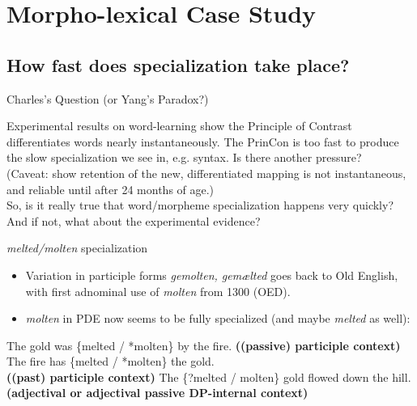 \documentclass[hyperref={pdfpagelabels=false}]{beamer}
\begin{document}
\section{Morpho-lexical Case Study}
\subsection{How fast does specialization take place?}

\begin{frame}{Charles's Question (or Yang's Paradox?)}
		\begin{center}
			Experimental results on word-learning show the Principle of Contrast differentiates words nearly instantaneously. The PrinCon is too fast to produce the slow specialization we see in, e.g. syntax. Is there another pressure?\\
			\vspace*{2mm}
			\small{(Caveat: \citet{bionetal2013} show retention of the new, differentiated mapping is not instantaneous, and reliable until after 24 months of age.)}\\
			\vspace*{5mm}
			\large{So, is it really true that word/morpheme specialization happens very quickly? And if not, what about the experimental evidence?}
		\end{center}
\end{frame}



\begin{frame}{\textsl{melted/molten} specialization}
\begin{itemize}
\item Variation in participle forms \textsl{gemolten, gemælted} goes back to Old English, with first adnominal use of \textsl{molten} from 1300 (OED).
\item \textsl{molten} in PDE now seems to be fully specialized (and maybe \textsl{melted} as well):
\end{itemize}
\begin{exe}
	\ex The gold was \{melted / *molten\} by the fire. \textbf{((passive) participle context)}
	\ex The fire has  \{melted / *molten\} the gold.\\\textbf{((past) participle context)}
	\ex The \{?melted / molten\} gold flowed down the hill. \textbf{(adjectival or adjectival passive DP-internal context)}
\end{exe}

\end{frame}
\end{document}
